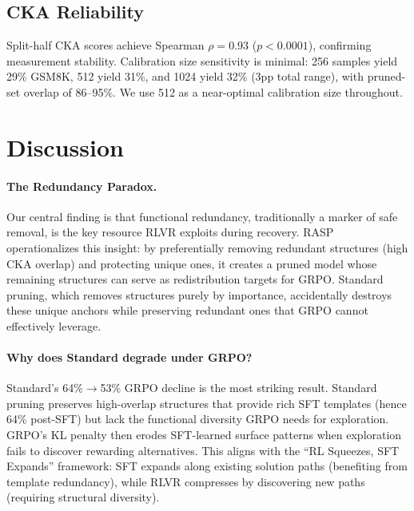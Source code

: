 \documentclass[11pt,a4paper]{article}
\newcommand{\method}{RASP}
\begin{document}
\subsection{CKA Reliability}
\label{sec:reliability}

Split-half CKA scores achieve Spearman $\rho = 0.93$ ($p < 0.0001$), confirming measurement stability. Calibration size sensitivity is minimal: 256 samples yield 29\% GSM8K, 512 yield 31\%, and 1024 yield 32\% (3pp total range), with pruned-set overlap of 86--95\%. We use 512 as a near-optimal calibration size throughout.

\section{Discussion}
\label{sec:discussion}

\paragraph{The Redundancy Paradox.} Our central finding is that functional redundancy, traditionally a marker of safe removal, is the key resource RLVR exploits during recovery. \method{} operationalizes this insight: by preferentially removing redundant structures (high CKA overlap) and protecting unique ones, it creates a pruned model whose remaining structures can serve as redistribution targets for GRPO. Standard pruning, which removes structures purely by importance, accidentally destroys these unique anchors while preserving redundant ones that GRPO cannot effectively leverage.

\paragraph{Why does Standard degrade under GRPO?} Standard's 64\%$\to$53\% GRPO decline is the most striking result. Standard pruning preserves high-overlap structures that provide rich SFT templates (hence 64\% post-SFT) but lack the functional diversity GRPO needs for exploration. GRPO's KL penalty then erodes SFT-learned surface patterns when exploration fails to discover rewarding alternatives. This aligns with the ``RL Squeezes, SFT Expands'' framework: SFT expands along existing solution paths (benefiting from template redundancy), while RLVR compresses by discovering new paths (requiring structural diversity).
\end{document}
